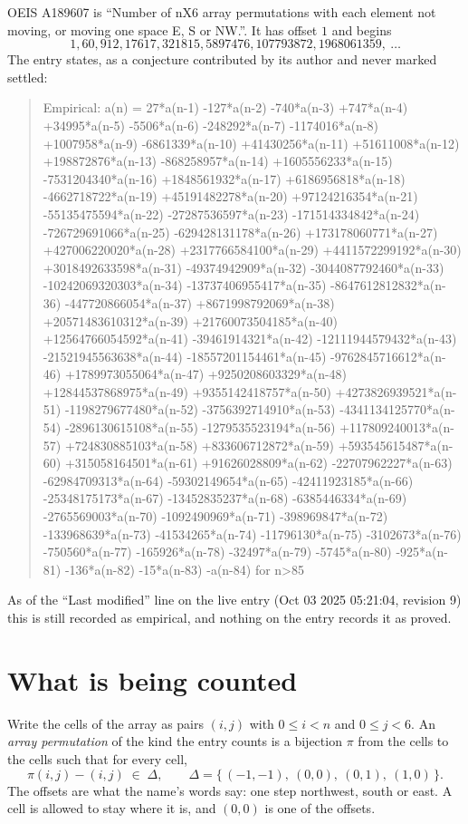 \documentclass[11pt,a4paper]{article}
\theoremstyle{plain}
\theoremstyle{definition}
\begin{document}
OEIS A189607 is ``Number of nX6 array permutations with each element not moving, or moving one space E, S or NW.''. It has offset $1$ and begins
\[
1, 60, 912, 17617, 321815, 5897476, 107793872, 1968061359,\ \dots
\]
The entry states, as a conjecture contributed by its author and never marked settled:
\begin{quote}
Empirical: a(n) = 27*a(n-1) -127*a(n-2) -740*a(n-3) +747*a(n-4) +34995*a(n-5) -5506*a(n-6) -248292*a(n-7) -1174016*a(n-8) +1007958*a(n-9) -6861339*a(n-10) +41430256*a(n-11) +51611008*a(n-12) +198872876*a(n-13) -868258957*a(n-14) +1605556233*a(n-15) -7531204340*a(n-16) +1848561932*a(n-17) +6186956818*a(n-18) -4662718722*a(n-19) +45191482278*a(n-20) +97124216354*a(n-21) -55135475594*a(n-22) -27287536597*a(n-23) -171514334842*a(n-24) -726729691066*a(n-25) -629428131178*a(n-26) +173178060771*a(n-27) +427006220020*a(n-28) +2317766584100*a(n-29) +4411572299192*a(n-30) +3018492633598*a(n-31) -49374942909*a(n-32) -3044087792460*a(n-33) -10242069320303*a(n-34) -13737406955417*a(n-35) -8647612812832*a(n-36) -447720866054*a(n-37) +8671998792069*a(n-38) +20571483610312*a(n-39) +21760073504185*a(n-40) +12564766054592*a(n-41) -39461914321*a(n-42) -12111944579432*a(n-43) -21521945563638*a(n-44) -18557201154461*a(n-45) -9762845716612*a(n-46) +1789973055064*a(n-47) +9250208603329*a(n-48) +12844537868975*a(n-49) +9355142418757*a(n-50) +4273826939521*a(n-51) -1198279677480*a(n-52) -3756392714910*a(n-53) -4341134125770*a(n-54) -2896130615108*a(n-55) -1279535523194*a(n-56) +117809240013*a(n-57) +724830885103*a(n-58) +833606712872*a(n-59) +593545615487*a(n-60) +315058164501*a(n-61) +91626028809*a(n-62) -22707962227*a(n-63) -62984709313*a(n-64) -59302149654*a(n-65) -42411923185*a(n-66) -25348175173*a(n-67) -13452835237*a(n-68) -6385446334*a(n-69) -2765569003*a(n-70) -1092490969*a(n-71) -398969847*a(n-72) -133968639*a(n-73) -41534265*a(n-74) -11796130*a(n-75) -3102673*a(n-76) -750560*a(n-77) -165926*a(n-78) -32497*a(n-79) -5745*a(n-80) -925*a(n-81) -136*a(n-82) -15*a(n-83) -a(n-84) for n>85
\end{quote}
As of the ``Last modified'' line on the live entry (Oct 03 2025 05:21:04, revision 9) this is still
recorded as empirical, and nothing on the entry records it as proved.

\section{What is being counted}

Write the cells of the array as pairs $(i,j)$ with $0\le i<n$ and $0\le j<6$. An
\emph{array permutation} of the kind the entry counts is a bijection $\pi$ from the cells to
the cells such that for every cell,
\[
\pi(i,j)-(i,j)\;\in\;\Delta,\qquad
\Delta=\{\,(-1,-1),\ (0,0),\ (0,1),\ (1,0)\,\}.
\]
The offsets are what the name's words say: one step northwest, south or east. A cell is allowed to stay where it is, and $(0,0)$ is one of the offsets.
\end{document}
